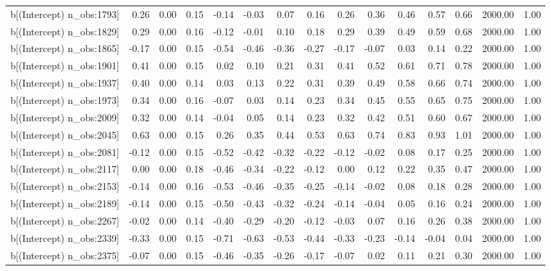 \begin{table}[ht]
\begin{tabular}{rrrrrrrrrrrrrrr}
  b[(Intercept) n\_obs:1793] & 0.26 & 0.00 & 0.15 & -0.14 & -0.03 & 0.07 & 0.16 & 0.26 & 0.36 & 0.46 & 0.57 & 0.66 & 2000.00 & 1.00 \\ 
  b[(Intercept) n\_obs:1829] & 0.29 & 0.00 & 0.16 & -0.12 & -0.01 & 0.10 & 0.18 & 0.29 & 0.39 & 0.49 & 0.59 & 0.68 & 2000.00 & 1.00 \\ 
  b[(Intercept) n\_obs:1865] & -0.17 & 0.00 & 0.15 & -0.54 & -0.46 & -0.36 & -0.27 & -0.17 & -0.07 & 0.03 & 0.14 & 0.22 & 2000.00 & 1.00 \\ 
  b[(Intercept) n\_obs:1901] & 0.41 & 0.00 & 0.15 & 0.02 & 0.10 & 0.21 & 0.31 & 0.41 & 0.52 & 0.61 & 0.71 & 0.78 & 2000.00 & 1.00 \\ 
  b[(Intercept) n\_obs:1937] & 0.40 & 0.00 & 0.14 & 0.03 & 0.13 & 0.22 & 0.31 & 0.39 & 0.49 & 0.58 & 0.66 & 0.74 & 2000.00 & 1.00 \\ 
  b[(Intercept) n\_obs:1973] & 0.34 & 0.00 & 0.16 & -0.07 & 0.03 & 0.14 & 0.23 & 0.34 & 0.45 & 0.55 & 0.65 & 0.75 & 2000.00 & 1.00 \\ 
  b[(Intercept) n\_obs:2009] & 0.32 & 0.00 & 0.14 & -0.04 & 0.05 & 0.14 & 0.23 & 0.32 & 0.42 & 0.51 & 0.60 & 0.67 & 2000.00 & 1.00 \\ 
  b[(Intercept) n\_obs:2045] & 0.63 & 0.00 & 0.15 & 0.26 & 0.35 & 0.44 & 0.53 & 0.63 & 0.74 & 0.83 & 0.93 & 1.01 & 2000.00 & 1.00 \\ 
  b[(Intercept) n\_obs:2081] & -0.12 & 0.00 & 0.15 & -0.52 & -0.42 & -0.32 & -0.22 & -0.12 & -0.02 & 0.08 & 0.17 & 0.25 & 2000.00 & 1.00 \\ 
  b[(Intercept) n\_obs:2117] & 0.00 & 0.00 & 0.18 & -0.46 & -0.34 & -0.22 & -0.12 & 0.00 & 0.12 & 0.22 & 0.35 & 0.47 & 2000.00 & 1.00 \\ 
  b[(Intercept) n\_obs:2153] & -0.14 & 0.00 & 0.16 & -0.53 & -0.46 & -0.35 & -0.25 & -0.14 & -0.02 & 0.08 & 0.18 & 0.28 & 2000.00 & 1.00 \\ 
  b[(Intercept) n\_obs:2189] & -0.14 & 0.00 & 0.15 & -0.50 & -0.43 & -0.32 & -0.24 & -0.14 & -0.04 & 0.05 & 0.16 & 0.24 & 2000.00 & 1.00 \\ 
  b[(Intercept) n\_obs:2267] & -0.02 & 0.00 & 0.14 & -0.40 & -0.29 & -0.20 & -0.12 & -0.03 & 0.07 & 0.16 & 0.26 & 0.38 & 2000.00 & 1.00 \\ 
  b[(Intercept) n\_obs:2339] & -0.33 & 0.00 & 0.15 & -0.71 & -0.63 & -0.53 & -0.44 & -0.33 & -0.23 & -0.14 & -0.04 & 0.04 & 2000.00 & 1.00 \\ 
  b[(Intercept) n\_obs:2375] & -0.07 & 0.00 & 0.15 & -0.46 & -0.35 & -0.26 & -0.17 & -0.07 & 0.02 & 0.11 & 0.21 & 0.30 & 2000.00 & 1.00 \\ 

\end{tabular}
\end{table}
